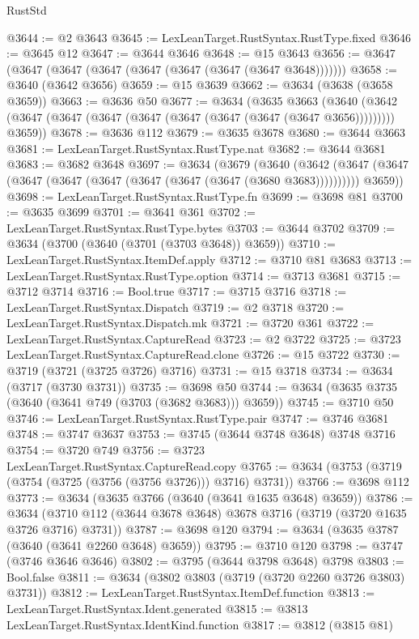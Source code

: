 \begin{lexlean}{RustStd}
\begin{coremodule}
@3644 := @2 @3643
@3645 := LexLeanTarget.RustSyntax.RustType.fixed
@3646 := @3645 @12
@3647 := @3644 @3646
@3648 := @15 @3643
@3656 := @3647 (@3647 (@3647 (@3647 (@3647 (@3647 (@3647 (@3647 @3648)))))))
@3658 := @3640 (@3642 @3656)
@3659 := @15 @3639
@3662 := @3634 (@3638 (@3658 @3659))
@3663 := @3636 @50
@3677 := @3634
    (@3635
      @3663
      (@3640 (@3642 (@3647 (@3647 (@3647 (@3647 (@3647 (@3647 (@3647 (@3647 @3656))))))))) @3659))
@3678 := @3636 @112
@3679 := @3635 @3678
@3680 := @3644 @3663
@3681 := LexLeanTarget.RustSyntax.RustType.nat
@3682 := @3644 @3681
@3683 := @3682 @3648
@3697 := @3634
    (@3679
      (@3640
        (@3642 (@3647 (@3647 (@3647 (@3647 (@3647 (@3647 (@3647 (@3647 (@3680 @3683))))))))))
        @3659))
@3698 := LexLeanTarget.RustSyntax.RustType.fn
@3699 := @3698 @81
@3700 := @3635 @3699
@3701 := @3641 @361
@3702 := LexLeanTarget.RustSyntax.RustType.bytes
@3703 := @3644 @3702
@3709 := @3634 (@3700 (@3640 (@3701 (@3703 @3648)) @3659))
@3710 := LexLeanTarget.RustSyntax.ItemDef.apply
@3712 := @3710 @81 @3683
@3713 := LexLeanTarget.RustSyntax.RustType.option
@3714 := @3713 @3681
@3715 := @3712 @3714
@3716 := Bool.true
@3717 := @3715 @3716
@3718 := LexLeanTarget.RustSyntax.Dispatch
@3719 := @2 @3718
@3720 := LexLeanTarget.RustSyntax.Dispatch.mk
@3721 := @3720 @361
@3722 := LexLeanTarget.RustSyntax.CaptureRead
@3723 := @2 @3722
@3725 := @3723 LexLeanTarget.RustSyntax.CaptureRead.clone
@3726 := @15 @3722
@3730 := @3719 (@3721 (@3725 @3726) @3716)
@3731 := @15 @3718
@3734 := @3634 (@3717 (@3730 @3731))
@3735 := @3698 @50
@3744 := @3634 (@3635 @3735 (@3640 (@3641 @749 (@3703 (@3682 @3683))) @3659))
@3745 := @3710 @50
@3746 := LexLeanTarget.RustSyntax.RustType.pair
@3747 := @3746 @3681
@3748 := @3747 @3637
@3753 := @3745 (@3644 @3748 @3648) @3748 @3716
@3754 := @3720 @749
@3756 := @3723 LexLeanTarget.RustSyntax.CaptureRead.copy
@3765 := @3634 (@3753 (@3719 (@3754 (@3725 (@3756 (@3756 @3726))) @3716) @3731))
@3766 := @3698 @112
@3773 := @3634 (@3635 @3766 (@3640 (@3641 @1635 @3648) @3659))
@3786 := @3634 (@3710 @112 (@3644 @3678 @3648) @3678 @3716 (@3719 (@3720 @1635 @3726 @3716) @3731))
@3787 := @3698 @120
@3794 := @3634 (@3635 @3787 (@3640 (@3641 @2260 @3648) @3659))
@3795 := @3710 @120
@3798 := @3747 (@3746 @3646 @3646)
@3802 := @3795 (@3644 @3798 @3648) @3798
@3803 := Bool.false
@3811 := @3634 (@3802 @3803 (@3719 (@3720 @2260 @3726 @3803) @3731))
@3812 := LexLeanTarget.RustSyntax.ItemDef.function
@3813 := LexLeanTarget.RustSyntax.Ident.generated
@3815 := @3813 LexLeanTarget.RustSyntax.IdentKind.function
@3817 := @3812 (@3815 @81)

\end{coremodule}
\end{lexlean}
